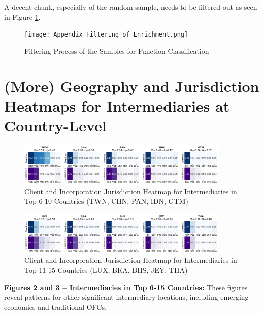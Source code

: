 A decent chunk, especially of the random sample, needs to be filtered out as seen in Figure \ref{fig:appendix_filtering_enrichment}.

\begin{figure}[htbp]
    \centering
    \texttt{[image: Appendix\_Filtering\_of\_Enrichment.png]}
    \caption{Filtering Process of the Samples for Function-Classification}
    \label{fig:appendix_filtering_enrichment}
\end{figure}

\newpage

\section{(More) Geography and Jurisdiction Heatmaps for Intermediaries at Country-Level}

\begin{figure}[htbp]
    \centering
    \includegraphics[width=0.9\textwidth]{images/Geography_Country_Heatmaps_Top6_10.png}
    \caption{Client and Incorporation Jurisdiction Heatmap for Intermediaries in Top 6-10 Countries (TWN, CHN, PAN, IDN, GTM)}
    \label{fig:geography_country_heatmaps_top6_10}
\end{figure}
\begin{figure}[htbp]
    \centering
    \includegraphics[width=0.9\textwidth]{images/Geography_Country_Heatmaps_Top11_15.png}
    \caption{Client and Incorporation Jurisdiction Heatmap for Intermediaries in Top 11-15 Countries (LUX, BRA, BHS, JEY, THA)}
    \label{fig:geography_country_heatmaps_top11_15}
\end{figure}

\textbf{Figures \ref{fig:geography_country_heatmaps_top6_10} and \ref{fig:geography_country_heatmaps_top11_15} – Intermediaries in Top 6-15 Countries:}
These figures reveal patterns for other significant intermediary locations, including emerging economies and traditional OFCs.

